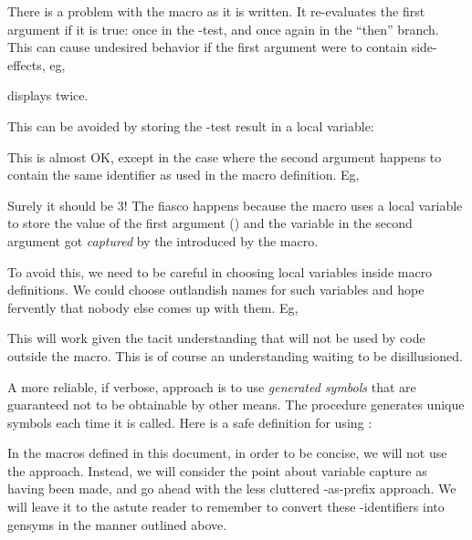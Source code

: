 There is a problem with the  macro as it is
written.  It re-evaluates the first argument if it is
true: once in the -test, and once again in the
``then'' branch.  This can cause undesired behavior if
the first argument were to contain side-effects, eg,


\n displays  twice.

This can be avoided by storing
the -test result in a local variable:


\n This is almost OK, except in the case where the
  second argument happens to contain the same
  identifier  as used in the macro definition.
  Eg,


\n Surely it should be 3!  The fiasco happens because
the macro uses a local variable  to store the
value of the first argument () and the 
variable 
 in the second argument got {\em captured} by
the
 introduced by the macro.

To avoid this, we need to be careful in choosing local
variables inside macro definitions.  We could choose
outlandish names for such variables and hope fervently
that nobody else comes up with them.   Eg,


\n This will work given the tacit understanding 
that  will not be used by code outside the
macro.  This is of course an understanding waiting to
be disillusioned.


A more reliable, if verbose, approach is to use {\em
generated symbols} that are guaranteed not to be
obtainable by other means.  The procedure 
generates unique symbols each time it is called.  Here
is a safe definition for  using :


\n In the macros defined in this document, in order to be
concise, we will not use the  approach.
Instead, we will consider the point about variable
capture as having been made, and go ahead with the less
cluttered \q{+}-as-prefix approach.  We will leave it
to the astute reader to remember to convert these
\q{+}-identifiers into gensyms in the manner outlined
above.

